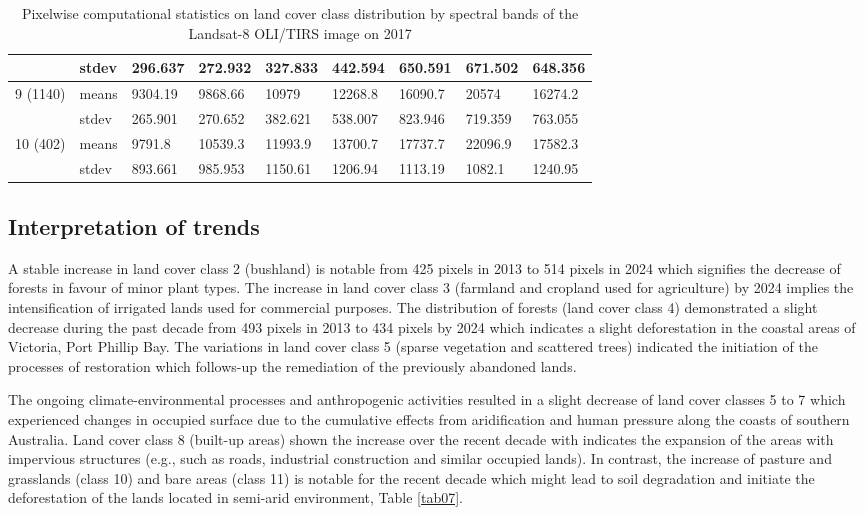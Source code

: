 \documentclass[jmse,article,submit,pdftex,moreauthors]{Definitions/mdpi}
\begin{document}
\begin{table}[H]
\begin{tabularx}{\linewidth}{p{1.3cm}p{1.0cm}p{1.0cm}p{1.0cm}p{1.0cm}p{1.0cm}p{1.0cm}p{1.0cm}p{1.0cm}}
    & stdev & 296.637 & 272.932 & 327.833 & 442.594 & 650.591 & 671.502 & 648.356 \\
    \midrule
    \multirow{2}{*}{9 (1140)} & means & 9304.19 & 9868.66 & 10979 & 12268.8 & 16090.7 & 20574 & 16274.2 \\
    & stdev & 265.901 & 270.652 & 382.621 & 538.007 & 823.946 & 719.359 & 763.055 \\
    \midrule
    \multirow{2}{*}{10 (402)} & means & 9791.8 & 10539.3 & 11993.9 & 13700.7 & 17737.7 & 22096.9 & 17582.3 \\
    & stdev & 893.661 & 985.953 & 1150.61 & 1206.94 & 1113.19 & 1082.1 &1240.95 \\
    \midrule 
\bottomrule
\end{tabularx}
  \caption{Pixelwise computational statistics on land cover class distribution by spectral bands of the Landsat-8 OLI/TIRS image on 2017}
  \label{tab05}
\end{table}

\subsection{Interpretation of trends}
A stable increase in land cover class 2 (bushland) is notable from 425 pixels in 2013 to 514 pixels in 2024 which signifies the decrease of forests in favour of minor plant types. The increase in land cover class 3 (farmland and cropland used for agriculture) by 2024 implies the intensification of irrigated lands used for commercial purposes. The distribution of forests (land cover class 4) demonstrated a slight decrease during the past decade from 493 pixels in 2013 to 434 pixels by 2024 which indicates a slight deforestation in the coastal areas of Victoria, Port Phillip Bay. The variations in land cover class 5 (sparse vegetation and scattered trees) indicated the initiation of the processes of restoration which follows-up the remediation of the previously abandoned lands. 

The ongoing climate-environmental processes and anthropogenic activities resulted in a slight decrease of land cover classes 5 to 7 which experienced changes in occupied surface due to the cumulative effects from aridification and human pressure along the coasts of southern Australia. Land cover class 8 (built-up areas) shown the increase over the recent decade with indicates the expansion of the areas with impervious structures (e.g., such as roads, industrial construction and similar occupied lands). In contrast, the increase of pasture and grasslands (class 10) and bare areas (class 11) is notable for the recent decade which might lead to soil degradation and initiate the deforestation of the lands located in semi-arid environment, Table \ref{tab07}. 
\end{document}
